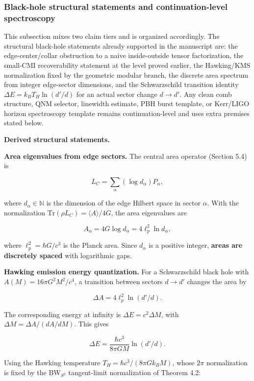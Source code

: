 \subsubsection{Black-hole structural statements and continuation-level spectroscopy}\label{511-discrete-horizon-area-spectrum-and-hawking-emission-established}

This subsection mixes two claim tiers and is organized accordingly. The structural black-hole statements already supported in the manuscript are: the edge-center/collar obstruction to a naive inside-outside tensor factorization, the small-CMI recoverability statement at the level proved earlier, the Hawking/KMS normalization fixed by the geometric modular branch, the discrete area spectrum from integer edge-sector dimensions, and the Schwarzschild transition identity \(\Delta E = k_B T_H \ln(d'/d)\) for an actual sector change \(d \to d'\). Any clean comb structure, QNM selector, linewidth estimate, PBH burst template, or Kerr/LIGO horizon spectroscopy template remains continuation-level and uses extra premises stated below.

\textbf{Derived structural statements.}

\textbf{Area eigenvalues from edge sectors.} The central area operator (Section 5.4) is

\[
L_C = \sum_\alpha (\log d_\alpha) P_\alpha,
\]

where \(d_\alpha \in \mathbb{N}\) is the dimension of the edge Hilbert space in sector \(\alpha\). With the normalization \(\mathrm{Tr}(\rho L_C) = \langle A
\rangle / 4G\), the area eigenvalues are

\[
A_\alpha = 4G \log d_\alpha = 4\ell_p^2 \ln d_\alpha,
\]

where \(\ell_p^2 = \hbar G/c^3\) is the Planck area. Since \(d_\alpha\) is a positive integer, \textbf{areas are discretely spaced} with logarithmic gaps.

\textbf{Hawking emission energy quantization.} For a Schwarzschild black hole with \(A(M) = 16\pi G^2 M^2/c^4\), a transition between sectors \(d \to d'\) changes the area by

\[
\Delta A = 4\ell_p^2 \ln(d'/d).
\]

The corresponding energy at infinity is \(\Delta E = c^2 \Delta M\), with \(\Delta M = \Delta A / (dA/dM)\). This gives

\[
\Delta E = \frac{\hbar c^3}{8\pi G M} \ln(d'/d).
\]

Using the Hawking temperature \(T_H = \hbar c^3 / (8\pi G k_B M)\), whose \(2\pi\) normalization is fixed by the BW\(_{S^2}\) tangent-limit normalization of Theorem 4.2:

